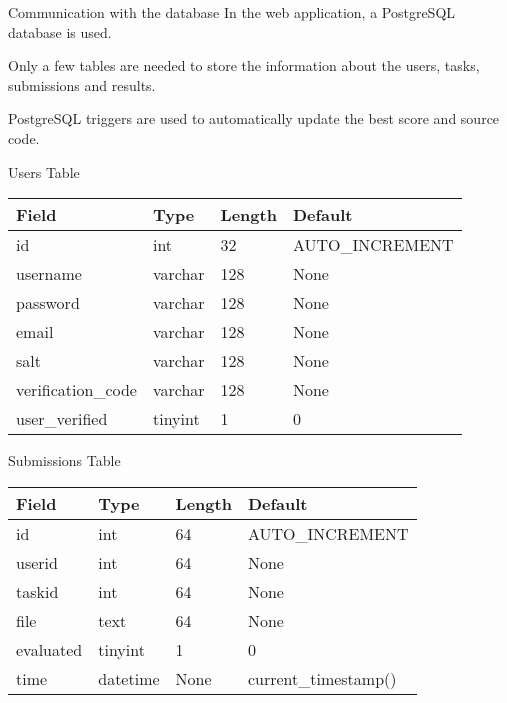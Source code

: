 \documentclass{beamer}
\begin{document}
	\begin{frame}[fragile]
		\tiny
		\inputminted{python}{examples/4/app.py}
	\end{frame}

	\begin{frame}{Communication with the database}
		In the web application, a PostgreSQL database is used. \par

		Only a few tables are needed to store the information about the users, tasks, submissions and results. \par

		PostgreSQL triggers are used to automatically update the best score and source code. 
	\end{frame}

	\begin{frame}{Users Table}
		\begin{tabular}{|l|l|l|l|}
		\hline
		Field & Type & Length & Default \\
		\hline
		id & int & 32 & AUTO\_INCREMENT \\
		username & varchar & 128 & None \\
		password & varchar & 128 & None \\
		email & varchar & 128 & None \\
		salt & varchar & 128 & None \\
		verification\_code & varchar & 128 & None \\
		user\_verified & tinyint & 1 & 0 \\
		\hline
		\end{tabular}
		\end{frame}

		\begin{frame}{Submissions Table}
			\begin{tabular}{|l|l|l|l|}
			\hline
			Field & Type & Length & Default \\
			\hline
			id & int & 64 & AUTO\_INCREMENT \\
			userid & int & 64 & None \\
			taskid & int & 64 & None \\
			file & text & 64 & None \\
			evaluated & tinyint & 1 & 0 \\
			time & datetime & None & current\_timestamp() \\
			\hline
			\end{tabular}
		\end{frame}
\end{document}
